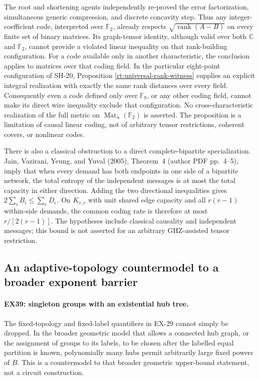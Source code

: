 The root and shortening agents independently re-proved the error
factorization, simultaneous generic compression, and discrete concavity
step. Thus any integer-coefficient code, interpreted over
$\mathbb F_2$, already respects $\sqrt{\operatorname{rank}(A-B)}$
on every finite set of binary matrices. Its graph-tensor identity,
although valid over both $\mathbb C$ and $\mathbb F_2$, cannot provide
a violated linear inequality on that rank-building configuration.
For a code available only in another characteristic, the conclusion
applies to matrices over that coding field. In the particular
eight-point configuration of SH-20, Proposition
\ref{rt:universal-rank-witness} supplies an explicit integral
realization with exactly the same rank distances over every field.
Consequently even a code defined only over $\mathbb F_9$, or any
other coding field, cannot make its direct wire inequality exclude
that configuration. No cross-characteristic realization of the full
metric on $\operatorname{Mat}_n(\mathbb F_2)$ is asserted. The
proposition is a limitation of causal linear coding, not of arbitrary
tensor restrictions, coherent covers, or nonlinear codes.

There is also a classical obstruction to a direct complete-bipartite
specialization. Jain, Vazirani, Yeung, and Yuval (2005), Theorem~4
(author PDF pp.~4--5), imply that when every demand has both endpoints
in one side of a bipartite network, the total entropy of the independent
messages is at most the total capacity in either direction. Adding
the two directional inequalities gives
$2\sum_iB_i\le\sum_eD_e$. On $K_{r,r}$ with unit shared edge
capacity and all $r(r-1)$ within-side demands, the common coding rate
is therefore at most $r/[2(r-1)]$. The hypotheses include classical
causality and independent messages; this bound is not asserted for
an arbitrary GHZ-assisted tensor restriction.

\subsection{An adaptive-topology countermodel to a broader exponent barrier}
\label{sec:ex-adaptive-countermodel}

\paragraph{EX39: singleton groups with an existential hub tree.}
The fixed-topology and fixed-label quantifiers in EX-29 cannot simply
be dropped. In the broader geometric model that allows a connected hub
graph, or the assignment of groups to its labels, to be chosen after
the labelled equal partition is known, polynomially many hubs permit
arbitrarily large fixed powers of $B$. This is a countermodel to that
broader geometric upper-bound statement, not a circuit construction.


